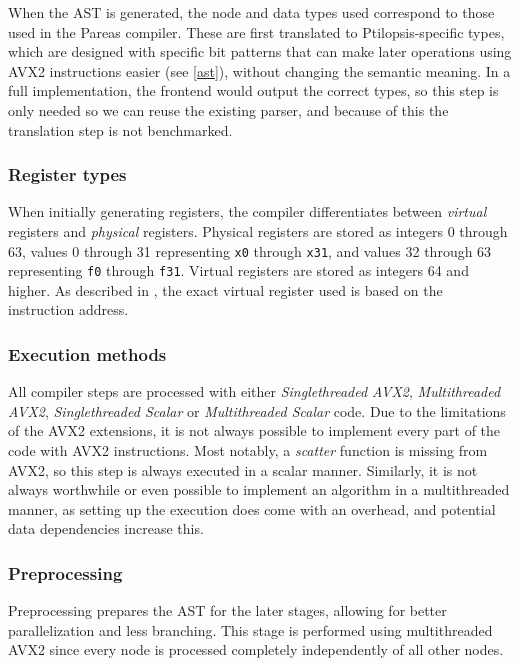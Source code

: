\documentclass[11pt,dvipsnames]{article}
\newcommand{\mono}[1]{\texttt{#1}}
\begin{document}
When the AST is generated, the node and data types used correspond to those used in the Pareas compiler. These are first translated to Ptilopsis-specific types, which are designed with specific bit patterns that can make later operations using AVX2 instructions easier (see \autoref{ast}), without changing the semantic meaning. In a full implementation, the frontend would output the correct types, so this step is only needed so we can reuse the existing parser, and because of this the translation step is not benchmarked.

\subsubsection*{Register types}
When initially generating registers, the compiler differentiates between \textit{virtual} registers and \textit{physical} registers. Physical registers are stored as integers 0 through 63, values 0 through 31 representing \mono{x0} through \mono{x31}, and values 32 through 63 representing \mono{f0} through \mono{f31}. Virtual registers are stored as integers 64 and higher. As described in \cite{huijben2021}, the exact virtual register used is based on the instruction address.

\subsubsection*{Execution methods}
All compiler steps are processed with either \textit{Singlethreaded AVX2}, \textit{Multithreaded AVX2}, \textit{Singlethreaded Scalar} or \textit{Multithreaded Scalar} code. Due to the limitations of the AVX2 extensions, it is not always possible to implement every part of the code with AVX2 instructions. Most notably, a \textit{scatter} function is missing from AVX2, so this step is always executed in a scalar manner. Similarly, it is not always worthwhile or even possible to implement an algorithm in a multithreaded manner, as setting up the execution does come with an overhead, and potential data dependencies increase this.

\subsubsection{Preprocessing} \label{preprocessing}
Preprocessing prepares the AST for the later stages, allowing for better parallelization and less branching. This stage is performed using multithreaded AVX2 since every node is processed completely independently of all other nodes.
\end{document}
